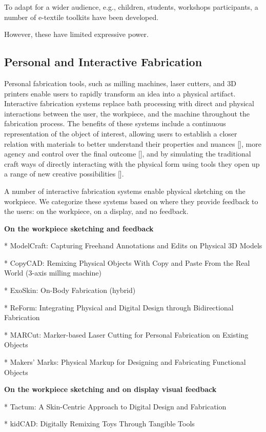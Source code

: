 To adapt for a wider audience, e.g., children, students, workshops participants, a number of e-textile toolkits have been developed.

However, these have limited expressive power.

\subsection{Personal and Interactive Fabrication}
Personal fabrication tools, such as milling machines, laser cutters, and 3D printers enable users to rapidly transform an idea into a physical artifact. Interactive fabrication systems replace bath processing with direct and physical interactions between the user, the workpiece, and the machine throughout the fabrication process. The benefits of these systems include a continuous representation of the object of interest, allowing users to establish a closer relation with materials to better understand their properties and nuances [], more agency and control over the final outcome [], and by simulating the traditional craft ways of directly interacting with the physical form using tools they open up a range of new creative possibilities [].

A number of interactive fabrication systems enable physical sketching on the workpiece. We categorize these systems based on where they provide feedback to the users: on the workpiece, on a display, and no feedback.


\textbf{On the workpiece sketching and feedback} 

* ModelCraft: Capturing Freehand Annotations and Edits on Physical 3D Models 

* CopyCAD: Remixing Physical Objects With Copy and Paste From the Real World (3-axis milling machine)

* ExoSkin: On-Body Fabrication (hybrid)

* ReForm: Integrating Physical and Digital Design through Bidirectional Fabrication 

* MARCut: Marker-based Laser Cutting for Personal Fabrication on Existing Objects 

* Makers' Marks: Physical Markup for Designing and Fabricating Functional Objects


\textbf{On the workpiece sketching and on display visual feedback} 

* Tactum: A Skin-Centric Approach to Digital Design and Fabrication 

* kidCAD: Digitally Remixing Toys Through Tangible Tools


